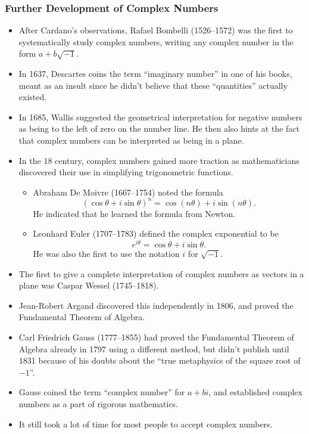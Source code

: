\documentclass[class=article, crop=false]{standalone}
\begin{document}
  \subsubsection{Further Development of Complex Numbers}
  \begin{itemize}
    \item After Cardano's observations, Rafael Bombelli (1526--1572) was the first to systematically study complex numbers, writing any complex number in the form $a + b\sqrt{-1}$.
    \item In 1637, Descartes coins the term ``imaginary number'' in one of his books, meant as an insult since he didn't believe that these ``quantities'' actually existed.
    \item In 1685, Wallis suggested the geometrical interpretation for negative numbers as being to the left of zero on the number line. He then also hints at the fact that complex numbers can be interpreted as being in a plane.
    \item In the 18 century, complex numbers gained more traction as mathematicians discovered their use in simplifying trigonometric functions.
    \begin{itemize}
      \item Abraham De Moivre (1667--1754) noted the formula
      \[
        (\cos\theta + i\sin\theta)^n = \cos(n\theta) + i\sin(n\theta).
      \]
      He indicated that he learned the formula from Newton.
      \item Leonhard Euler (1707--1783) defined the complex exponential to be
      \[
        e^{i\theta} = \cos\theta + i\sin\theta.
      \]
      He was also the first to use the notation $i$ for $\sqrt{-1}$.
    \end{itemize}
    \item The first to give a complete interpretation of complex numbers as vectors in a plane was Caspar Wessel (1745--1818).
    \item Jean-Robert Argand discovered this independently in 1806, and proved the Fundamental Theorem of Algebra.
    \item Carl Friedrich Gauss (1777--1855) had proved the Fundamental Theorem of Algebra already in 1797 using a different method, but didn't publish until 1831 because of his doubts about the ``true metaphysics of the square root of $-1$''.
    \item Gauss coined the term ``complex number'' for $a + bi$, and established complex numbers as a part of rigorous mathematics.
    \item It still took a lot of time for most people to accept complex numbers.
  \end{itemize}
\end{document}
